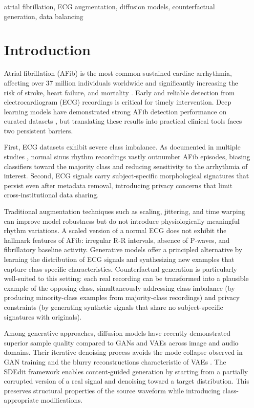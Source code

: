 \documentclass[conference]{IEEEtran}
\begin{document}
\begin{IEEEkeywords}
atrial fibrillation, ECG augmentation, diffusion models, counterfactual generation, data balancing
\end{IEEEkeywords}

\section{Introduction}

Atrial fibrillation (AFib) is the most common sustained cardiac arrhythmia, affecting over 37 million individuals worldwide and significantly increasing the risk of stroke, heart failure, and mortality \cite{andersen2019}. Early and reliable detection from electrocardiogram (ECG) recordings is critical for timely intervention. Deep learning models have demonstrated strong AFib detection performance on curated datasets \cite{petmezas2021}, but translating these results into practical clinical tools faces two persistent barriers.

First, ECG datasets exhibit severe class imbalance. As documented in multiple studies \cite{petmezas2021, delaney2019}, normal sinus rhythm recordings vastly outnumber AFib episodes, biasing classifiers toward the majority class and reducing sensitivity to the arrhythmia of interest. Second, ECG signals carry subject-specific morphological signatures that persist even after metadata removal, introducing privacy concerns that limit cross-institutional data sharing.

Traditional augmentation techniques such as scaling, jittering, and time warping can improve model robustness but do not introduce physiologically meaningful rhythm variations. A scaled version of a normal ECG does not exhibit the hallmark features of AFib: irregular R-R intervals, absence of P-waves, and fibrillatory baseline activity. Generative models offer a principled alternative by learning the distribution of ECG signals and synthesizing new examples that capture class-specific characteristics. Counterfactual generation is particularly well-suited to this setting: each real recording can be transformed into a plausible example of the opposing class, simultaneously addressing class imbalance (by producing minority-class examples from majority-class recordings) and privacy constraints (by generating synthetic signals that share no subject-specific signatures with originals).

Among generative approaches, diffusion models have recently demonstrated superior sample quality compared to GANs \cite{goodfellow2014} and VAEs \cite{kingma2014} across image and audio domains. Their iterative denoising process avoids the mode collapse observed in GAN training \cite{delaney2019} and the blurry reconstructions characteristic of VAEs \cite{bredell2023}. The SDEdit framework \cite{meng2022sdedit} enables content-guided generation by starting from a partially corrupted version of a real signal and denoising toward a target distribution. This preserves structural properties of the source waveform while introducing class-appropriate modifications.
\end{document}
